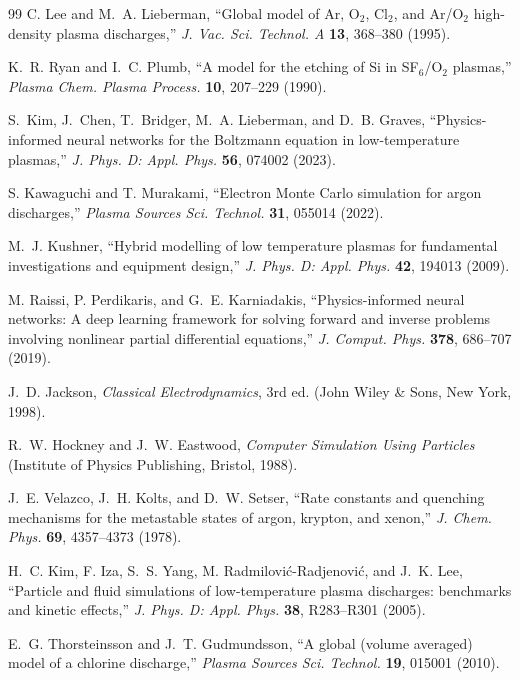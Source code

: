 \documentclass[11pt,a4paper]{report}
\begin{document}
\begin{thebibliography}{99}
C. Lee and M.~A. Lieberman,
``Global model of Ar, O$_2$, Cl$_2$, and Ar/O$_2$ high-density plasma discharges,''
\emph{J. Vac. Sci. Technol. A} \textbf{13}, 368--380 (1995).

K.~R. Ryan and I.~C. Plumb,
``A model for the etching of Si in SF$_6$/O$_2$ plasmas,''
\emph{Plasma Chem. Plasma Process.} \textbf{10}, 207--229 (1990).

S.~Kim, J.~Chen, T.~Bridger, M.~A. Lieberman, and D.~B. Graves,
``Physics-informed neural networks for the Boltzmann equation in low-temperature plasmas,''
\emph{J. Phys. D: Appl. Phys.} \textbf{56}, 074002 (2023).

S. Kawaguchi and T. Murakami,
``Electron Monte Carlo simulation for argon discharges,''
\emph{Plasma Sources Sci. Technol.} \textbf{31}, 055014 (2022).

M.~J. Kushner,
``Hybrid modelling of low temperature plasmas for fundamental investigations and equipment design,''
\emph{J. Phys. D: Appl. Phys.} \textbf{42}, 194013 (2009).

M. Raissi, P. Perdikaris, and G.~E. Karniadakis,
``Physics-informed neural networks: A deep learning framework for solving forward and inverse problems involving nonlinear partial differential equations,''
\emph{J. Comput. Phys.} \textbf{378}, 686--707 (2019).

J.~D. Jackson,
\emph{Classical Electrodynamics},
3rd ed. (John Wiley \& Sons, New York, 1998).

R.~W. Hockney and J.~W. Eastwood,
\emph{Computer Simulation Using Particles}
(Institute of Physics Publishing, Bristol, 1988).

J.~E. Velazco, J.~H. Kolts, and D.~W. Setser,
``Rate constants and quenching mechanisms for the metastable states of argon, krypton, and xenon,''
\emph{J. Chem. Phys.} \textbf{69}, 4357--4373 (1978).

H.~C. Kim, F. Iza, S.~S. Yang, M. Radmilovi\'c-Radjenovi\'c, and J.~K. Lee,
``Particle and fluid simulations of low-temperature plasma discharges: benchmarks and kinetic effects,''
\emph{J. Phys. D: Appl. Phys.} \textbf{38}, R283--R301 (2005).

E.~G. Thorsteinsson and J.~T. Gudmundsson,
``A global (volume averaged) model of a chlorine discharge,''
\emph{Plasma Sources Sci. Technol.} \textbf{19}, 015001 (2010).


\end{thebibliography}
\end{document}
